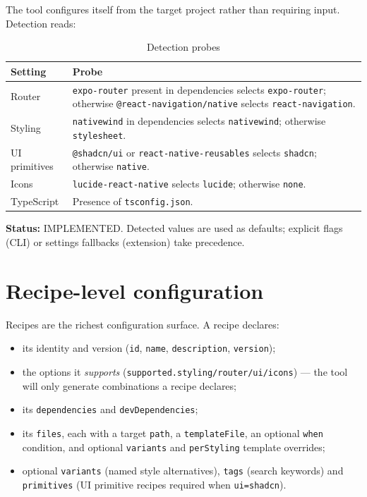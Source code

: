 The tool configures itself from the target project rather than requiring input.
Detection reads:

\begin{longtable}{p{4.6cm}p{9.6cm}}
\caption{Detection probes}\\
\toprule
\textbf{Setting} & \textbf{Probe} \\
\midrule

Router & \texttt{expo-router} present in dependencies selects
\texttt{expo-router}; otherwise \texttt{@react-navigation/native} selects
\texttt{react-navigation}. \\
Styling & \texttt{nativewind} in dependencies selects \texttt{nativewind};
otherwise \texttt{stylesheet}. \\
UI primitives & \texttt{@shadcn/ui} or \texttt{react-native-reusables} selects
\texttt{shadcn}; otherwise \texttt{native}. \\
Icons & \texttt{lucide-react-native} selects \texttt{lucide}; otherwise
\texttt{none}. \\
TypeScript & Presence of \texttt{tsconfig.json}. \\
\bottomrule
\end{longtable}

\textbf{Status:} IMPLEMENTED. Detected values are used as defaults; explicit
flags (CLI) or settings fallbacks (extension) take precedence.

\section{Recipe-level configuration}

Recipes are the richest configuration surface. A recipe declares:

\begin{itemize}
  \item its identity and version (\texttt{id}, \texttt{name}, \texttt{description},
        \texttt{version});
  \item the options it \emph{supports} (\texttt{supported.styling/router/ui/icons})
        --- the tool will only generate combinations a recipe declares;
  \item its \texttt{dependencies} and \texttt{devDependencies};
  \item its \texttt{files}, each with a target \texttt{path}, a
        \texttt{templateFile}, an optional \texttt{when} condition, and optional
        \texttt{variants} and \texttt{perStyling} template overrides;
  \item optional \texttt{variants} (named style alternatives),
        \texttt{tags} (search keywords) and \texttt{primitives} (UI primitive
        recipes required when \texttt{ui=shadcn}).
\end{itemize}

